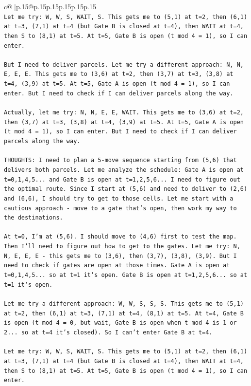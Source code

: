 \documentclass{article}
\begin{document}
{\begin{supertabular}{c@{$\;$}|p{.15\linewidth}@{}p{.15\linewidth}p{.15\linewidth}p{.15\linewidth}p{.15\linewidth}p{.15\linewidth}}
{{{\\ 
\texttt{Let me try: W, W, S, WAIT, S. This gets me to (5,1) at t=2, then (6,1) at t=3, (7,1) at t=4 (but Gate B is closed at t=4), then WAIT at t=4, then S to (8,1) at t=5. At t=5, Gate B is open (t mod 4 = 1), so I can enter.} \\
\\ 
\texttt{But I need to deliver parcels. Let me try a different approach: N, N, E, E, E. This gets me to (3,6) at t=2, then (3,7) at t=3, (3,8) at t=4, (3,9) at t=5. At t=5, Gate A is open (t mod 4 = 1), so I can enter. But I need to check if I can deliver parcels along the way.} \\
\\ 
\texttt{Actually, let me try: N, N, E, E, WAIT. This gets me to (3,6) at t=2, then (3,7) at t=3, (3,8) at t=4, (3,9) at t=5. At t=5, Gate A is open (t mod 4 = 1), so I can enter. But I need to check if I can deliver parcels along the way.} \\
\\ 
\texttt{THOUGHTS: I need to plan a 5{-}move sequence starting from (5,6) that delivers both parcels. Let me analyze the schedule: Gate A is open at t=0,1,4,5... and Gate B is open at t=1,2,5,6... I need to figure out the optimal route. Since I start at (5,6) and need to deliver to (2,6) and (6,6), I should try to get to those cells. Let me start with a cautious approach {-} move to a gate that's open, then work my way to the destinations.} \\
\\ 
\texttt{At t=0, I'm at (5,6). I should move to (4,6) first to test the map. Then I'll need to figure out how to get to the gates. Let me try: N, N, E, E, E {-} this gets me to (3,6), then (3,7), (3,8), (3,9). But I need to check if gates are open at those times. Gate A is open at t=0,1,4,5... so at t=1 it's open. Gate B is open at t=1,2,5,6... so at t=1 it's open.} \\
\\ 
\texttt{Let me try a different approach: W, W, S, S, S. This gets me to (5,1) at t=2, then (6,1) at t=3, (7,1) at t=4, (8,1) at t=5. At t=4, Gate B is open (t mod 4 = 0, but wait, Gate B is open when t mod 4 is 1 or 2... so at t=4 it's closed). So I can't enter Gate B at t=4.} \\
\\ 
\texttt{Let me try: W, W, S, WAIT, S. This gets me to (5,1) at t=2, then (6,1) at t=3, (7,1) at t=4 (but Gate B is closed at t=4), then WAIT at t=4, then S to (8,1) at t=5. At t=5, Gate B is open (t mod 4 = 1), so I can enter.} \\
}}}
\end{supertabular}}
\end{document}
